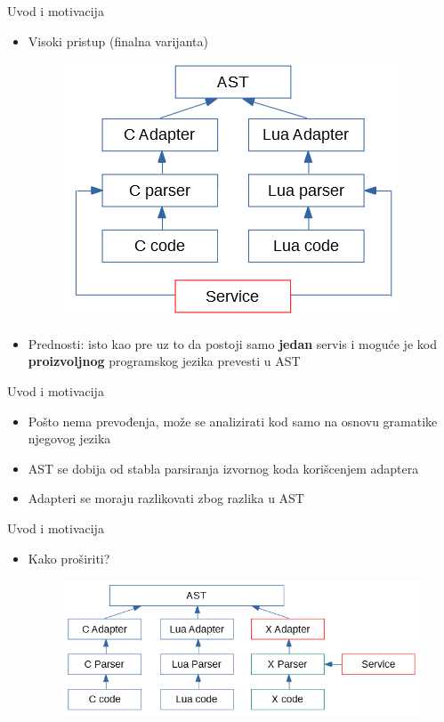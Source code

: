 \documentclass{beamer}
\begin{document}
\begin{frame}{Uvod i motivacija}
    \begin{itemize}
        \item Visoki pristup (finalna varijanta)
        \begin{figure}[h!]
            \centering
            \includegraphics[scale=0.8]{images/approach_4.PNG}
        \end{figure}
        \item Prednosti: isto kao pre uz to da postoji samo \textbf{jedan} servis i mogu\'c{}e je kod \textbf{proizvoljnog} programskog jezika prevesti u AST
    \end{itemize}
\end{frame}

\begin{frame}{Uvod i motivacija}
    \begin{itemize}
        \item Po\v{s}to nema prevođenja, mo\v{z}e se analizirati kod samo na osnovu gramatike njegovog jezika
        \item AST se dobija od stabla parsiranja izvornog koda kori\v{s}cenjem adaptera
        \item Adapteri se moraju razlikovati zbog razlika u AST
    \end{itemize}
\end{frame}

\begin{frame}{Uvod i motivacija}
    \begin{itemize}
        \item Kako pro\v{s}iriti?
        \begin{figure}[h!]
            \centering
            \includegraphics[scale=0.65]{images/approach_5.PNG}
        \end{figure}
    \end{itemize}
\end{frame}
\end{document}
